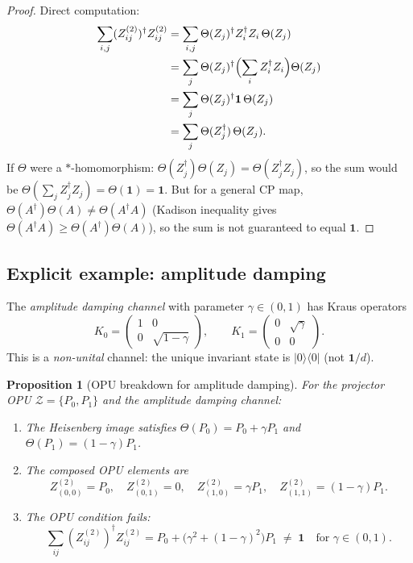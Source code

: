 \documentclass[12pt,a4paper]{article}
\newtheorem{proposition}[theorem]{Proposition}
\begin{document}
\begin{proof}
Direct computation:
\begin{align*}
  \sum_{i,j}(Z^{(2)}_{ij})^\dagger Z^{(2)}_{ij}
  &= \sum_{i,j}\Theta(Z_j)^\dagger Z_i^\dagger Z_i\,\Theta(Z_j) \\
  &= \sum_j \Theta(Z_j)^\dagger\Bigl(\sum_i Z_i^\dagger Z_i\Bigr)\Theta(Z_j) \\
  &= \sum_j \Theta(Z_j)^\dagger\mathbf{1}\,\Theta(Z_j) \\
  &= \sum_j \Theta(Z_j^\dagger)\,\Theta(Z_j).
\end{align*}
If $\Theta$ were a $*$-homomorphism: $\Theta(Z_j^\dagger)\Theta(Z_j)=\Theta(Z_j^\dagger Z_j)$,
so the sum would be $\Theta(\sum_j Z_j^\dagger Z_j) = \Theta(\mathbf{1}) = \mathbf{1}$.
But for a general CP map, $\Theta(A^\dagger)\Theta(A) \neq \Theta(A^\dagger A)$ (Kadison inequality
gives $\Theta(A^\dagger A)\geq\Theta(A^\dagger)\Theta(A)$), so the sum is not
guaranteed to equal $\mathbf{1}$.
\end{proof}

\subsection{Explicit example: amplitude damping}

The \emph{amplitude damping channel} with parameter $\gamma\in(0,1)$ has Kraus operators
\[
  K_0 = \begin{pmatrix}1 & 0 \\ 0 & \sqrt{1-\gamma}\end{pmatrix},\qquad
  K_1 = \begin{pmatrix}0 & \sqrt{\gamma} \\ 0 & 0\end{pmatrix}.
\]
This is a \emph{non-unital} channel: the unique invariant state is $|0\rangle\langle 0|$ (not $\mathbf{1}/d$).

\begin{proposition}[OPU breakdown for amplitude damping]\label{prop:amp_damp}
For the projector OPU $\mathcal{Z}=\{P_0,P_1\}$ and the amplitude damping channel:
\begin{enumerate}
  \item The Heisenberg image satisfies
    $\Theta(P_0) = P_0 + \gamma P_1$ and $\Theta(P_1) = (1-\gamma)P_1$.
  \item The composed OPU elements are
    \[
      Z^{(2)}_{(0,0)} = P_0,\quad
      Z^{(2)}_{(0,1)} = 0,\quad
      Z^{(2)}_{(1,0)} = \gamma P_1,\quad
      Z^{(2)}_{(1,1)} = (1-\gamma)P_1.
    \]
  \item The OPU condition fails:
    \[
      \sum_{ij}(Z^{(2)}_{ij})^\dagger Z^{(2)}_{ij}
      = P_0 + \bigl(\gamma^2 + (1-\gamma)^2\bigr)P_1 \;\neq\; \mathbf{1}
      \quad\text{for }\gamma\in(0,1).
    \]
\end{enumerate}
\end{proposition}
\end{document}
